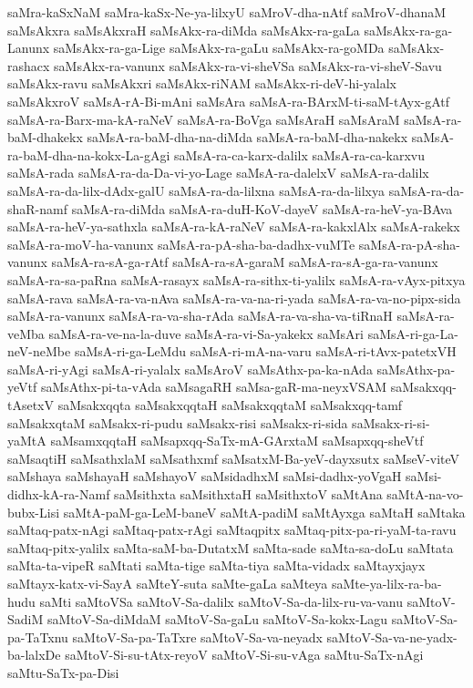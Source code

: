 {saMra-kaSxNaM
saMra-kaSx-Ne-ya-lilxyU
saMroV-dha-nAtf
saMroV-dhanaM
saMsAkxra
saMsAkxraH
saMsAkx-ra-diMda
saMsAkx-ra-gaLa
saMsAkx-ra-ga-Lanunx
saMsAkx-ra-ga-Lige
saMsAkx-ra-gaLu
saMsAkx-ra-goMDa
saMsAkx-rashacx
saMsAkx-ra-vanunx
saMsAkx-ra-vi-sheVSa
saMsAkx-ra-vi-sheV-Savu
saMsAkx-ravu
saMsAkxri
saMsAkx-riNAM
saMsAkx-ri-deV-hi-yalalx
saMsAkxroV
saMsA-rA-Bi-mAni
saMsAra
saMsA-ra-BArxM-ti-saM-tAyx-gAtf
saMsA-ra-Barx-ma-kA-raNeV
saMsA-ra-BoVga
saMsAraH
saMsAraM
saMsA-ra-baM-dhakekx
saMsA-ra-baM-dha-na-diMda
saMsA-ra-baM-dha-nakekx
saMsA-ra-baM-dha-na-kokx-La-gAgi
saMsA-ra-ca-karx-dalilx
saMsA-ra-ca-karxvu
saMsA-rada
saMsA-ra-da-Da-vi-yo-Lage
saMsA-ra-dalelxV
saMsA-ra-dalilx
saMsA-ra-da-lilx-dAdx-galU
saMsA-ra-da-lilxna
saMsA-ra-da-lilxya
saMsA-ra-da-shaR-namf
saMsA-ra-diMda
saMsA-ra-duH-KoV-dayeV
saMsA-ra-heV-ya-BAva
saMsA-ra-heV-ya-sathxla
saMsA-ra-kA-raNeV
saMsA-ra-kakxlAlx
saMsA-rakekx
saMsA-ra-moV-ha-vanunx
saMsA-ra-pA-sha-ba-dadhx-vuMTe
saMsA-ra-pA-sha-vanunx
saMsA-ra-sA-ga-rAtf
saMsA-ra-sA-garaM
saMsA-ra-sA-ga-ra-vanunx
saMsA-ra-sa-paRna
saMsA-rasayx
saMsA-ra-sithx-ti-yalilx
saMsA-ra-vAyx-pitxya
saMsA-rava
saMsA-ra-va-nAva
saMsA-ra-va-na-ri-yada
saMsA-ra-va-no-pipx-sida
saMsA-ra-vanunx
saMsA-ra-va-sha-rAda
saMsA-ra-va-sha-va-tiRnaH
saMsA-ra-veMba
saMsA-ra-ve-na-la-duve
saMsA-ra-vi-Sa-yakekx
saMsAri
saMsA-ri-ga-La-neV-neMbe
saMsA-ri-ga-LeMdu
saMsA-ri-mA-na-varu
saMsA-ri-tAvx-patetxVH
saMsA-ri-yAgi
saMsA-ri-yalalx
saMsAroV
saMsAthx-pa-ka-nAda
saMsAthx-pa-yeVtf
saMsAthx-pi-ta-vAda
saMsagaRH
saMsa-gaR-ma-neyxVSAM
saMsakxqq-tAsetxV
saMsakxqqta
saMsakxqqtaH
saMsakxqqtaM
saMsakxqq-tamf
saMsakxqtaM
saMsakx-ri-pudu
saMsakx-risi
saMsakx-ri-sida
saMsakx-ri-si-yaMtA
saMsamxqqtaH
saMsapxqq-SaTx-mA-GArxtaM
saMsapxqq-sheVtf
saMsaqtiH
saMsathxlaM
saMsathxmf
saMsatxM-Ba-yeV-dayxsutx
saMseV-viteV
saMshaya
saMshayaH
saMshayoV
saMsidadhxM
saMsi-dadhx-yoVgaH
saMsi-didhx-kA-ra-Namf
saMsithxta
saMsithxtaH
saMsithxtoV
saMtAna
saMtA-na-vo-bubx-Lisi
saMtA-paM-ga-LeM-baneV
saMtA-padiM
saMtAyxga
saMtaH
saMtaka
saMtaq-patx-nAgi
saMtaq-patx-rAgi
saMtaqpitx
saMtaq-pitx-pa-ri-yaM-ta-ravu
saMtaq-pitx-yalilx
saMta-saM-ba-DutatxM
saMta-sade
saMta-sa-doLu
saMtata
saMta-ta-vipeR
saMtati
saMta-tige
saMta-tiya
saMta-vidadx
saMtayxjayx
saMtayx-katx-vi-SayA
saMteY-suta
saMte-gaLa
saMteya
saMte-ya-lilx-ra-ba-hudu
saMti
saMtoVSa
saMtoV-Sa-dalilx
saMtoV-Sa-da-lilx-ru-va-vanu
saMtoV-SadiM
saMtoV-Sa-diMdaM
saMtoV-Sa-gaLu
saMtoV-Sa-kokx-Lagu
saMtoV-Sa-pa-TaTxnu
saMtoV-Sa-pa-TaTxre
saMtoV-Sa-va-neyadx
saMtoV-Sa-va-ne-yadx-ba-lalxDe
saMtoV-Si-su-tAtx-reyoV
saMtoV-Si-su-vAga
saMtu-SaTx-nAgi
saMtu-SaTx-pa-Disi
}
